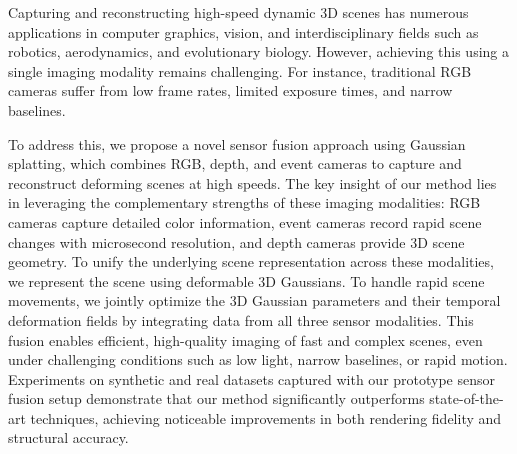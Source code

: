 Capturing and reconstructing high-speed dynamic 3D scenes has numerous applications in computer graphics, vision, and interdisciplinary fields such as robotics, aerodynamics, and evolutionary biology. 
However, achieving this using a single imaging modality remains challenging.
For instance, traditional RGB cameras suffer from low frame rates, limited exposure times, and narrow baselines. 

To address this, we propose a novel sensor fusion approach using Gaussian splatting, which combines RGB, depth, and event cameras to capture and reconstruct deforming scenes at high speeds. 
The key insight of our method lies in leveraging the complementary strengths of these imaging modalities:
RGB cameras capture detailed color information, event cameras record rapid scene changes with microsecond resolution, and depth cameras provide 3D scene geometry.
To unify the underlying scene representation across these modalities, 
we represent the scene using deformable 3D Gaussians.
To handle rapid scene movements, we jointly optimize the 3D Gaussian parameters and their temporal deformation fields by integrating data from all three sensor modalities. 
This fusion enables efficient, high-quality imaging of fast and complex scenes, even under challenging conditions such as low light, narrow baselines, or rapid motion. 
Experiments on synthetic and real datasets captured with our prototype sensor fusion setup demonstrate that our method significantly outperforms state-of-the-art techniques, achieving noticeable improvements in both rendering fidelity and structural accuracy.



